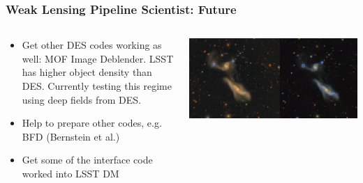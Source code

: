 \documentclass[aspectratio=169]{beamer}
\begin{document}
\frame
{

    \frametitle{Weak Lensing Pipeline Scientist: Future}


    \begin{columns}
        \begin{column}{0.5\textwidth}

            \begin{itemize}

                \item Get other DES codes working as well: MOF Image Deblender.  LSST
                    has higher object density than DES.  Currently testing this regime
                    using deep fields from DES.

                \item Help to prepare other codes, e.g. BFD (Bernstein et al.)

                \item Get some of the interface code worked into LSST DM

            \end{itemize}

        \end{column}

        \begin{column}{0.5\textwidth}
            \centering
            \includegraphics[angle=90,height=0.8\textheight]{HSC-DES-interacting-pair.jpg}
        \end{column}
    \end{columns}


}
\end{document}

